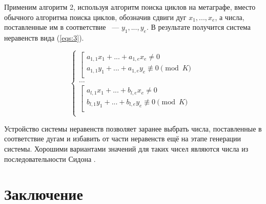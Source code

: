 \documentclass[14pt]{mmcs-article}
\begin{document}
Применим алгоритм 2, используя алгоритм поиска циклов на метаграфе, вместо обычного алгоритма поиска циклов, обозначив сдвиги дуг $x_1, ..., x_e$, а числа, поставленные им в соответствие ~--- $y_1, ..., y_e$. В результате получится система неравенств вида (\ref{eqs:3}).

\begin{equation}
  \left\{
    \begin{array}{ll}
        \left[  
          \begin{array}{ll}
              a_{1,1} x_1 + ... + a_{1,e} x_e \neq 0 \\
              a_{1,1} y_1 + ... + a_{1,e} y_e \not\equiv 0 \pmod K \\
          \end{array}
        \right.\\
        ...\\
        \left[  
          \begin{array}{ll}
              a_{l,1} x_1 + ... + b_{l,e} x_e \neq 0 \\
              b_{l,1} y_1 + ... + b_{l,e} y_e \not\equiv 0 \pmod K \\
          \end{array}
        \right.\\
    \end{array}
  \right.
  \label{eqs:3}
\end{equation}

Устройство системы неравенств позволяет заранее выбрать числа, поставленные в соответствие дугам и избавить от части неравенств ещё на этапе генерации системы. Хорошими вариантами значений для таких чисел являются числа из последовательности Сидона \cite{sidon}.

\newpage
{}
\section*{Заключение}



\newpage

\renewcommand{\refname}{\centering \textbf{Литература}}
\end{document}
